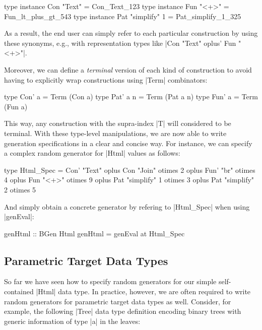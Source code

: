 \begin{code}
type instance Con "Text"        = Con_Text_123
type instance Fun "<+>"         = Fun_lt_plus_gt_543
type instance Pat "simplify" 1  = Pat_simplify_1_325
\end{code}

As a result, the end user can simply refer to each particular construction by
using these synonyms, e.g., with representation types like |Con "Text" oplus'
Fun "<+>"|.


Moreover, we can define a \emph{terminal} version of each kind of construction
to avoid having to explicitly wrap constructions using |Term| combinators:

\begin{code}
type Con' a    = Term  (Con a)
type Pat' a n  = Term  (Pat a n)
type Fun' a    = Term  (Fun a)
\end{code}

This way, any construction with the supra-index |T| will considered to be
terminal.
%
With these type-level manipulations, we are now able to write generation
specifications in a clear and concise way.
%
For instance, we can specify a complex random generator for |Html| values as
follows:

\begin{code}
type Html_Spec
  =      Con'  "Text"
  oplus  Con   "Join"         otimes 2
  oplus  Fun'  "br"           otimes 4
  oplus  Fun   "<+>"          otimes 9
  oplus  Pat   "simplify"  1  otimes 3
  oplus  Pat   "simplify"  2  otimes 5
\end{code}

And simply obtain a concrete generator by refering to |Html_Spec| when using
|genEval|:

\begin{code}
genHtml :: BGen Html
genHtml = genEval at Html_Spec
\end{code}


%
\subsection{Parametric Target Data Types }

So far we have seen how to specify random generators for our simple
self-contained |Html| data type.
%
In practice, however, we are often required to write random generators for
parametric target data types as well.
%
Consider, for example, the following |Tree| data type definition encoding binary
trees with generic information of type |a| in the leaves:

